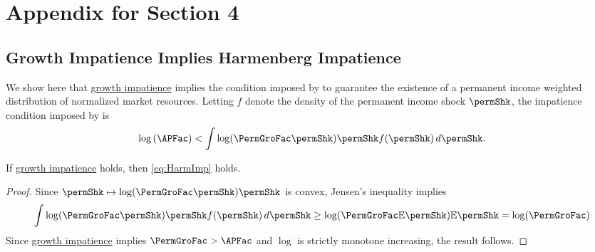 \documentclass[\econtexRoot/BufferStockTheory]{subfiles}
\begin{document}
\hypertarget{ApndxBalancedGrowthcNrmAndCov}{}

\section{Appendix for Section 4}

\subsection{Growth Impatience Implies Harmenberg Impatience}\label{sec:AppxHarmImpGIC}


We show here that \hyperlink{GICRaw}{growth impatience} implies the condition imposed by \cite{harmenbergAggregating} to guarantee 
the existence of a permanent income weighted distribution of normalized market resources.
Letting $f$ denote the density of the permanent income shock $\permShk$, the impatience condition imposed by \cite{harmenbergAggregating} is
%
%
\begin{equation}
  \label{eq:HarmImp}
  \log \left( \APFac \right) < \int \log(\PermGroFac\permShk) \permShk f(\permShk)\,d\permShk .
\end{equation}
%
%

\begin{claim}
  If \hyperlink{GICRaw}{growth impatience} holds, then \eqref{eq:HarmImp} holds.
\end{claim}
%
\begin{proof}
Since $\permShk\mapsto \log(\PermGroFac\permShk) \permShk$ is convex, Jensen's inequality implies
%
\begin{equation}
  \label{eq:Jensen}
  \int \log(\PermGroFac\permShk) \permShk f(\permShk)\,d\permShk \geq \log(\PermGroFac\mathbb{E}\permShk) \mathbb{E}\permShk = \log(\PermGroFac)
\end{equation}
%
Since \hyperlink{GICRaw}{growth impatience} implies $\PermGroFac > \APFac$ and $\log$ is strictly monotone increasing, the result follows.

\end{proof}



\end{document}
